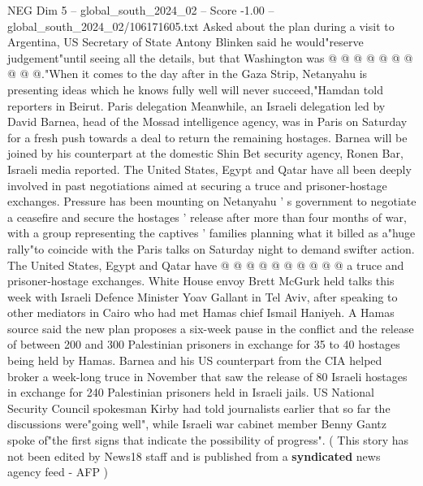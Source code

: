 \begin{textsample}{NEG Dim 5 – global\_south\_2024\_02 – Score -1.00 – global\_south\_2024\_02/106171605.txt}
Asked about the plan during a visit to Argentina, US Secretary of State Antony Blinken said he would"reserve judgement"until seeing all the details, but that Washington was @ @ @ @ @ @ @ @ @ @."When it comes to the day after in the Gaza Strip, Netanyahu is presenting ideas which he knows fully well will never succeed,"Hamdan told reporters in Beirut.
Paris delegation Meanwhile, an Israeli delegation led by David Barnea, head of the Mossad intelligence agency, was in Paris on Saturday for a fresh push towards a deal to return the remaining hostages.
Barnea will be joined by his counterpart at the domestic Shin Bet security agency, Ronen Bar, Israeli media reported.
The United States, Egypt and Qatar have all been deeply involved in past negotiations aimed at securing a truce and prisoner-hostage exchanges.
Pressure has been mounting on Netanyahu ' s government to negotiate a ceasefire and secure the hostages ' release after more than four months of war, with a group representing the captives ' families planning what it billed as a"huge rally"to coincide with the Paris talks on Saturday night to demand swifter action.
The United States, Egypt and Qatar have @ @ @ @ @ @ @ @ @ @ a truce and prisoner-hostage exchanges.
White House envoy Brett McGurk held talks this week with Israeli Defence Minister Yoav Gallant in Tel Aviv, after speaking to other mediators in Cairo who had met Hamas chief Ismail Haniyeh.
A Hamas source said the new plan proposes a six-week pause in the conflict and the release of between 200 and 300 Palestinian prisoners in exchange for 35 to 40 hostages being held by Hamas.
Barnea and his US counterpart from the CIA helped broker a week-long truce in November that saw the release of 80 Israeli hostages in exchange for 240 Palestinian prisoners held in Israeli jails.
US National Security Council spokesman Kirby had told journalists earlier that so far the discussions were"going well", while Israeli war cabinet member Benny Gantz spoke of"the first signs that indicate the possibility of progress". ( This story has not been edited by News18 staff and is published from a \textbf{syndicated} news agency feed - AFP )

\end{textsample}
